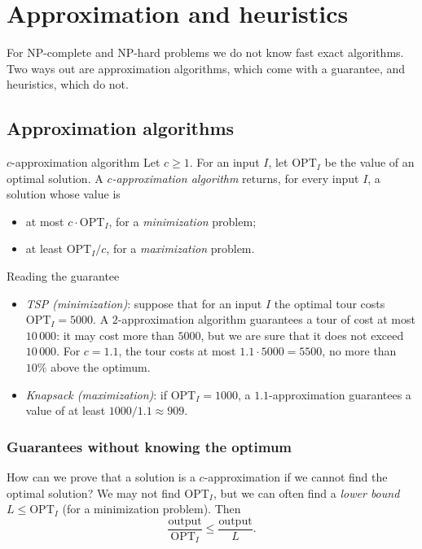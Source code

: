 \documentclass[a4paper,12pt,oneside]{report}
\newcommand{\OPT}{\mathrm{OPT}}
\begin{document}
\chapter{Approximation and heuristics}

For NP-complete and NP-hard problems we do not know fast exact
algorithms. Two ways out are approximation algorithms, which come with
a guarantee, and heuristics, which do not.

\section{Approximation algorithms}

\begin{frameddefn}{$c$-approximation algorithm}\label{def:approximation}
Let $c\geq1$. For an input $I$, let $\OPT_I$ be the value of an optimal
solution. A \emph{$c$-approximation algorithm} returns, for every input
$I$, a solution whose value is
\begin{itemize}
  \item at most $c\cdot\OPT_I$, for a \emph{minimization} problem;
  \item at least $\OPT_I/c$, for a \emph{maximization} problem.
\end{itemize}
\end{frameddefn}

\begin{framedexample}{Reading the guarantee}\label{ex:approximation}
\begin{itemize}
  \item \emph{TSP (minimization)}: suppose that for an input $I$ the
    optimal tour costs $\OPT_I=5000$. A $2$-approximation algorithm
    guarantees a tour of cost at most $10\,000$: it may cost more than
    $5000$, but we are sure that it does not exceed $10\,000$. For
    $c=1.1$, the tour costs at most $1.1\cdot5000=5500$, no more than
    $10\%$ above the optimum.
  \item \emph{Knapsack (maximization)}: if $\OPT_I=1000$, a
    $1.1$-approximation guarantees a value of at least
    $1000/1.1\approx909$.
\end{itemize}
\end{framedexample}

\subsection{Guarantees without knowing the optimum}

How can we prove that a solution is a $c$-approximation if we cannot
find the optimal solution? We may not find $\OPT_I$, but we can often
find a \emph{lower bound} $L\leq\OPT_I$ (for a minimization problem).
Then
\[
  \frac{\text{output}}{\OPT_I}\leq\frac{\text{output}}{L}.
\]
\end{document}
